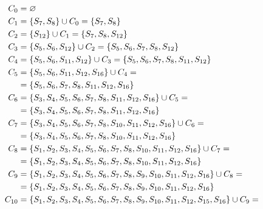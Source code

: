 \begin{itemize}
	      \begin{align*}
		      C_{0}  & = \varnothing                                                                                             \\
		      C_{1}  & = \cbr{S_{7}, S_{8}} \cup C_{0} = \cbr{S_{7}, S_{8}}                                                      \\
		      C_{2}  & = \cbr{S_{12}} \cup C_{1} = \cbr{S_7, S_8, S_{12}}                                                        \\
		      C_{3}  & = \cbr{S_5, S_6, S_{12}} \cup C_{2} = \cbr{S_5, S_6, S_7, S_8, S_{12}}                                    \\
		      C_{4}  & = \cbr{S_5, S_6, S_{11}, S_{12}} \cup C_{3} = \cbr{S_5, S_6, S_7, S_8, S_{11}, S_{12}}                    \\
		      C_{5}  & = \cbr{S_5, S_6, S_{11}, S_{12}, S_{16}} \cup C_{4} =                                                     \\
		             & = \cbr{S_5, S_6, S_7, S_8, S_{11}, S_{12}, S_{16}}                                                        \\
		      C_{6}  & = \cbr{S_3, S_4, S_5, S_6, S_7, S_8, S_{11}, S_{12}, S_{16}} \cup C_{5} =                                 \\
		             & = \cbr{S_3, S_4, S_5, S_6, S_7, S_8, S_{11}, S_{12}, S_{16}}                                              \\
		      C_{7}  & = \cbr{S_3, S_4, S_5, S_6, S_7, S_8, S_{10}, S_{11}, S_{12}, S_{16}} \cup C_{6} =                         \\
		             & = \cbr{S_3, S_4, S_5, S_6, S_7, S_8, S_{10}, S_{11}, S_{12}, S_{16}}                                      \\
		      C_{8}  & = \cbr{S_1, S_2, S_3, S_4, S_5, S_6, S_7, S_8, S_{10}, S_{11}, S_{12}, S_{16}} \cup C_{7} =               \\
		             & = \cbr{S_1, S_2, S_3, S_4, S_5, S_6, S_7, S_8, S_{10}, S_{11}, S_{12}, S_{16}}                            \\
		      C_{9}  & = \cbr{S_1, S_2, S_3, S_4, S_5, S_6, S_7, S_8, S_9, S_{10}, S_{11}, S_{12}, S_{16}} \cup C_{8} =          \\
		             & = \cbr{S_1, S_2, S_3, S_4, S_5, S_6, S_7, S_8, S_9, S_{10}, S_{11}, S_{12}, S_{16}}                       \\
		      C_{10} & = \cbr{S_1, S_2, S_3, S_4, S_5, S_6, S_7, S_8, S_9, S_{10}, S_{11}, S_{12}, S_{15}, S_{16}} \cup C_{9} =  \\

\end{align*}
\end{itemize}
